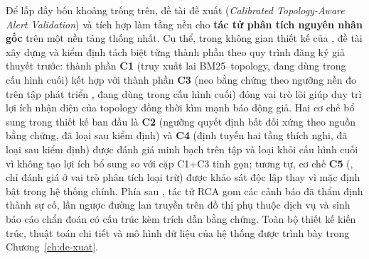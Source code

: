 Để lấp đầy bốn khoảng trống trên, đề tài đề xuất \textbf{\CTAV{}} (\emph{Calibrated Topology-Aware Alert Validation}) và tích hợp \CTAV{} làm tầng nền cho \textbf{tác tử phân tích nguyên nhân gốc} trên một nền tảng thống nhất. Cụ thể, trong không gian thiết kế của \CTAV{}, đề tài xây dựng và kiểm định tách biệt từng thành phần theo quy trình đăng ký giả thuyết trước: thành phần \textbf{C1} (truy xuất lai BM25--topology, đang dùng trong cấu hình cuối) kết hợp với thành phần \textbf{C3} (neo bằng chứng theo ngưỡng nền đo trên tập phát triển , đang dùng trong cấu hình cuối) đóng vai trò lõi giúp duy trì lợi ích nhận diện của topology đồng thời kìm mạnh báo động giả. Hai cơ chế bổ sung trong thiết kế ban đầu là \textbf{C2} (ngưỡng quyết định bất đối xứng theo nguồn bằng chứng, đã loại sau kiểm định) và \textbf{C4} (định tuyến hai tầng thích nghi, đã loại sau kiểm định) được đánh giá minh bạch trên tập  và loại khỏi cấu hình cuối vì không tạo lợi ích bổ sung so với cặp C1+C3 tinh gọn; tương tự, cơ chế \textbf{C5} (, chỉ đánh giá ở vai trò phân tích loại trừ) được khảo sát độc lập thay vì mặc định bật trong hệ thống chính. Phía sau \CTAV{}, tác tử RCA gom các cảnh báo đã thẩm định thành sự cố, lần ngược đường lan truyền trên đồ thị phụ thuộc dịch vụ và sinh báo cáo chẩn đoán có cấu trúc kèm trích dẫn bằng chứng. Toàn bộ thiết kế kiến trúc, thuật toán chi tiết và mô hình dữ liệu của hệ thống được trình bày trong Chương~\ref{ch:de-xuat}.
